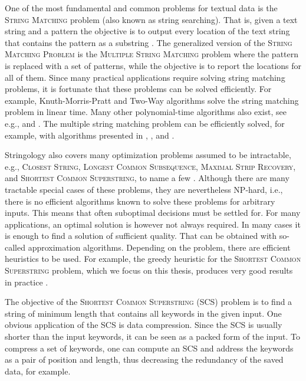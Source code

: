 \documentclass[english,twoside,censored,csm,algorithms-track-2020]{HYthesisML}
\theoremstyle{plain}
\theoremstyle{definition}
\numberwithin{testexample}{chapter}
\begin{document}
One of the most fundamental and common problems for textual data is the \textsc{String Matching} problem
(also known as string searching). 
That is, given a text string and a pattern the objective is to output every location of
the text string that contains the pattern as a substring \citep{Gusfield97}.
The generalized version of the \textsc{String Matching Problem}
is the \textsc{Multiple String Matching} problem where the pattern is replaced
with a set of
patterns, while the objective is to report the locations for all of them.
Since many practical applications require solving string matching problems,
it is fortunate that these problems can be solved efficiently.
For example, Knuth-Morris-Pratt \citep{Knuth77} and Two-Way \citep{Crochemore91}
algorithms solve the string matching problem in linear time. Many other polynomial-time algorithms
also exist, see e.g., \citep{Karp87} and \citep{Horspool80}.
The multiple string matching problem can be efficiently solved, for example, with algorithms
presented in \citep{Aho75}, \citep{Navarro00}, \citep{Karp87} and \citep{CommentzWalter79}.

Stringology also covers many optimization problems assumed to be intractable, e.g., 
\textsc{Closest String},
\textsc{Longest Common Subsequence},
\textsc{Maximal Strip Recovery},
and
\textsc{Shortest Common Superstring},
to name a few \citep{Bulteau14}.
Although there are many tractable special cases of these problems, they are nevertheless
\textsc{NP}-hard, i.e., there is no efficient algorithms known to solve these
problems for arbitrary inputs.
This means that often suboptimal decisions must be settled for.
For many applications, an optimal solution is however not always required. In many cases it is
enough to find a solution of sufficient quality.
That can be obtained with so-called approximation algorithms.
Depending on the problem, there are efficient heuristics to be used. For example, the
greedy heuristic for the \textsc{Shortest Common Superstring} problem, which we focus on this
thesis, produces very good results in practice \citep{Romero04}. 

The objective of the \textsc{Shortest Common Superstring} (SCS) problem is to find a string of
minimum length that contains all keywords in the given input.
One obvious application of the SCS is data compression. Since the SCS is usually shorter
than the input keywords, it can be seen as a packed form of the input. To compress a set of keywords,
one can compute an SCS and address the keywords as a pair of position and length, thus decreasing
the redundancy of the saved data, for example.
\end{document}
